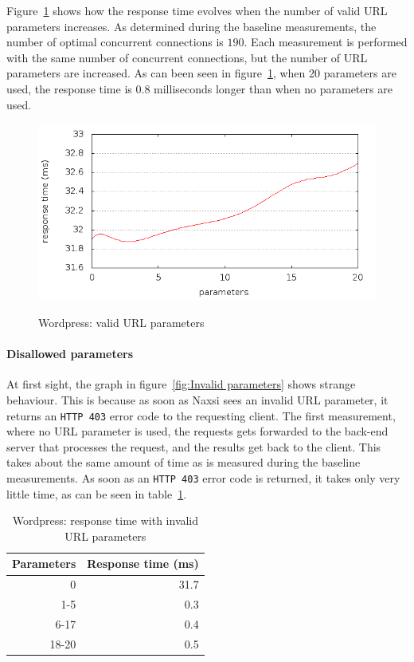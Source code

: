 \documentclass[Experiments]{subfiles}
\begin{document}
Figure~\ref{fig:wordpress_with_naxsi_valid_parameters} shows how the response time evolves when the number of valid \ac{URL} parameters increases. As determined during the baseline measurements, the number of optimal concurrent connections is $190$. Each measurement is performed with the same number of concurrent connections, but the number of \ac{URL} parameters are increased. As can been seen in figure~\ref{fig:wordpress_with_naxsi_valid_parameters}, when 20 parameters are used, the response time is $0.8$ milliseconds longer than when no parameters are used.

\begin{figure}[H]
\caption{Wordpress: valid URL parameters}
\centering
\includegraphics[scale=0.55] {images/results/wp_with_naxsi_incremented_allowed_parameters/output.png}
\label{fig:wordpress_with_naxsi_valid_parameters}
\end{figure}

\paragraph{Disallowed parameters}

At first sight, the graph in figure~\ref{fig:Invalid parameters} shows strange behaviour. This is because as soon as Naxsi sees an invalid \ac{URL} parameter, it returns an \verb+HTTP 403+ error code to the requesting client. The first measurement, where no \ac{URL} parameter is used, the requests gets forwarded to the back-end server that processes the request, and the results get back to the client. This takes about the same amount of time as is measured during the baseline measurements. As soon as an \verb+HTTP 403+ error code is returned, it takes only very little time, as can be seen in table~\ref{tab:wrtwiup}.

\begin{table}[H]
\caption{Wordpress: response time with invalid URL parameters}
\center
\begin{tabular}{|r|r|}
\hline
\textbf{Parameters} & \textbf{Response time (ms)}\\ \hline
0 & 31.7 \\ \hline
1-5 & 0.3 \\ \hline
6-17 & 0.4 \\ \hline
18-20 & 0.5 \\ \hline
\end{tabular}
\label{tab:wrtwiup}
\end{table}
\end{document}
